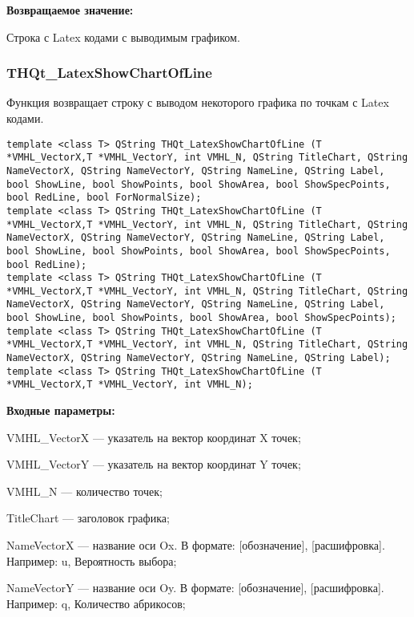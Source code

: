 \documentclass[a4paper,12pt]{article}
\begin{document}
\textbf{Возвращаемое значение:}

Строка с Latex кодами с выводимым графиком.


\subsubsection{THQt\_LatexShowChartOfLine}\label{THQt_LatexShowChartOfLine}

Функция возвращает строку с выводом некоторого графика по точкам с Latex кодами.


\begin{lstlisting}[label=code_syntax_THQt_LatexShowChartOfLine,caption=Синтаксис]
template <class T> QString THQt_LatexShowChartOfLine (T *VMHL_VectorX,T *VMHL_VectorY, int VMHL_N, QString TitleChart, QString NameVectorX, QString NameVectorY, QString NameLine, QString Label, bool ShowLine, bool ShowPoints, bool ShowArea, bool ShowSpecPoints, bool RedLine, bool ForNormalSize);
template <class T> QString THQt_LatexShowChartOfLine (T *VMHL_VectorX,T *VMHL_VectorY, int VMHL_N, QString TitleChart, QString NameVectorX, QString NameVectorY, QString NameLine, QString Label, bool ShowLine, bool ShowPoints, bool ShowArea, bool ShowSpecPoints, bool RedLine);
template <class T> QString THQt_LatexShowChartOfLine (T *VMHL_VectorX,T *VMHL_VectorY, int VMHL_N, QString TitleChart, QString NameVectorX, QString NameVectorY, QString NameLine, QString Label, bool ShowLine, bool ShowPoints, bool ShowArea, bool ShowSpecPoints);
template <class T> QString THQt_LatexShowChartOfLine (T *VMHL_VectorX,T *VMHL_VectorY, int VMHL_N, QString TitleChart, QString NameVectorX, QString NameVectorY, QString NameLine, QString Label);
template <class T> QString THQt_LatexShowChartOfLine (T *VMHL_VectorX,T *VMHL_VectorY, int VMHL_N);
\end{lstlisting}

\textbf{Входные параметры:}

    VMHL\_VectorX --- указатель на вектор координат X точек;
 
    VMHL\_VectorY --- указатель на вектор координат Y точек;
 
    VMHL\_N --- количество точек;
 
    TitleChart --- заголовок графика;
 
    NameVectorX --- название оси Ox. В формате: [обозначение], [расшифровка]. Например: u, Вероятность выбора;
 
    NameVectorY --- название оси Oy. В формате: [обозначение], [расшифровка]. Например: q, Количество абрикосов;
 
\end{document}
